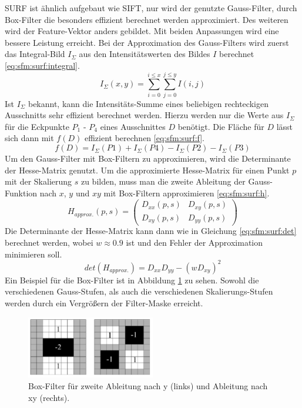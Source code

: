 \documentclass[12pt,titlepage, twoside]{article}
\begin{document}
SURF ist ähnlich aufgebaut wie SIFT, nur wird der genutzte Gauss-Filter, durch Box-Filter die besonders effizient berechnet werden approximiert.
Des weiteren wird der Feature-Vektor anders gebildet. Mit beiden Anpassungen wird eine bessere Leistung erreicht.
Bei der Approximation des Gauss-Filters wird zuerst das Integral-Bild $I_\Sigma$ aus den Intensitätswerten des Bildes $I$ berechnet \ref{eq:sfm:surf:integral}.
\begin{equation}
    \label{eq:sfm:surf:integral}
    I_\Sigma (x,y) = \sum_{i=0}^{i\leq x}\sum_{j=0}^{j\leq y}I(i,j)
\end{equation}
Ist $I_\Sigma$ bekannt, kann die Intensitäts-Summe eines beliebigen rechteckigen Ausschnitts sehr effizient berechnet werden. 
Hierzu werden nur die Werte aus $I_\Sigma$ für die Eckpunkte $P_1$ - $P_4$ eines Ausschnittes $D$ benötigt.
Die Fläche für $D$ lässt sich dann mit $f(D)$ effizient berechnen \ref{eq:sfm:surf:f}.
\begin{equation}
    \label{eq:sfm:surf:f}
    f(D) = I_\Sigma(P1) + I_\Sigma(P4) - I_\Sigma(P2) - I_\Sigma(P3)
\end{equation}
Um den Gauss-Filter mit Box-Filtern zu approximieren, wird die Determinante der Hesse-Matrix genutzt. 
Um die approximierte Hesse-Matrix für einen Punkt $p$ mit der Skalierung $s$ zu bilden, muss man die zweite Ableitung der Gauss-Funktion nach $x$, $y$ und $xy$ mit Box-Filtern approximieren \ref{eq:sfm:surf:h}.
\begin{equation}
    \label{eq:sfm:surf:h}
    H_{approx.}(p,s) = \left( \begin{smallmatrix} D_{xx}(p,s)&D_{xy}(p,s)\\ D_{xy}(p,s)&D_{yy}(p,s) \end{smallmatrix} \right)
\end{equation}
Die Determinante der Hesse-Matrix kann dann wie in Gleichung \ref{eq:sfm:surf:det} berechnet werden, wobei $w\approx 0.9$ ist und den Fehler der Approximation minimieren soll.
\begin{equation}
    \label{eq:sfm:surf:det}
    det(H_{approx.}) = D_{xx}D_{yy}-(wD_{xy})^2
\end{equation}
Ein Beispiel für die Box-Filter ist in Abbildung \ref{fig:surf:filter} zu sehen. Sowohl die verschiedenen Gauss-Stufen, als auch die verschiedenen Skalierungs-Stufen werden durch ein Vergrößern der Filter-Maske erreicht.
\begin{figure}
    \centering
    \includegraphics[width=0.5\textwidth]{./Images/SURF_BoxFilter.png}
    \caption{Box-Filter für zweite Ableitung nach y (links) und Ableitung nach xy (rechts). \cite{SURF}}
    \label{fig:surf:filter}
\end{figure}
\end{document}
